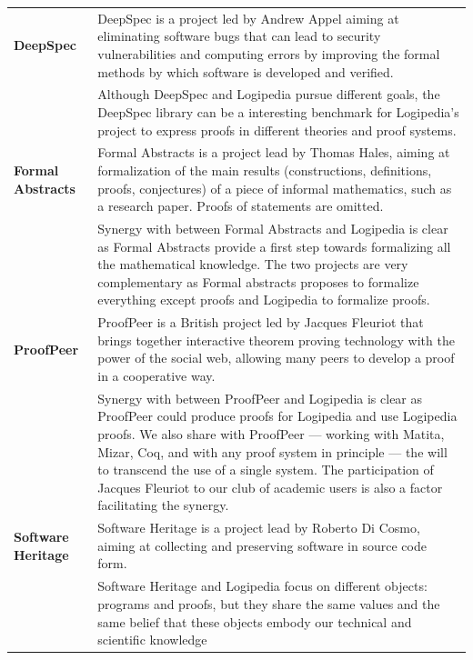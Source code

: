 \begin{longtable}{|p{}|p{}|}
\hline
{\bf DeepSpec}
&
DeepSpec is a project led by Andrew Appel aiming at eliminating
software bugs that can lead to security vulnerabilities and computing
errors by improving the formal methods by which software is developed
and verified.
\\
&
\hspace{0.4cm}
Although DeepSpec and Logipedia pursue different goals, the DeepSpec
library can be a interesting benchmark for Logipedia's project to
express proofs in different theories and proof systems.
\\
\hline
{\bf Formal Abstracts} & 
Formal Abstracts is a project lead by Thomas Hales, aiming at
formalization of the main results (constructions, definitions, proofs,
conjectures) of a piece of informal mathematics, such as a research
paper.  Proofs of statements are omitted.
\\
&
\hspace{0.4cm} Synergy with between Formal Abstracts and Logipedia is
clear as Formal Abstracts provide a first step towards formalizing all
the mathematical knowledge. The two projects are very complementary as 
Formal abstracts proposes to formalize everything except proofs and
Logipedia to formalize proofs.
\\
\hline
{\bf ProofPeer}
&
ProofPeer is a British project led by Jacques Fleuriot that 
brings together interactive theorem proving technology with
the power of the social web, allowing many peers to develop a proof 
in a cooperative way.\\
&
\hspace{0.4cm}
Synergy with between ProofPeer and Logipedia is clear as ProofPeer
could produce proofs for Logipedia and use Logipedia proofs.  We also
share with ProofPeer --- working with Matita, Mizar, Coq, and with any
proof system in principle --- the will to transcend the use of a single
system. The participation of Jacques Fleuriot to our club of academic users 
is also a factor facilitating the synergy.\\
\hline
{\bf Software Heritage} & 
Software Heritage is a project lead by Roberto Di Cosmo, aiming at 
collecting and preserving software in source code form.\\
&
\hspace{0.4cm} Software Heritage and Logipedia focus on different
objects: programs and proofs, but they share the same values and the same 
belief that these objects embody our technical and scientific knowledge 

\end{longtable}
